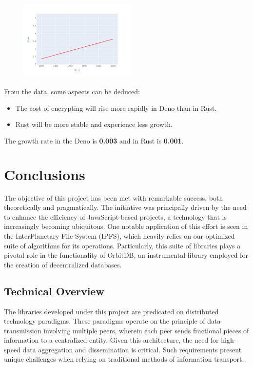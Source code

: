 \documentclass[10pt,journal,compsoc]{IEEEtran}
\begin{document}
\begin{figure}[H]
    \centering
    \includegraphics[width=0.52\textwidth]{images/trend_box_rust}
\end{figure}

From the data, some aspects can be deduced:
\begin{itemize}
    \item The cost of encrypting will rise more rapidly in Deno than in Rust.
    \item Rust will be more stable and experience less growth.
\end{itemize}

The growth rate in the Deno is \textbf{0.003} and in Rust is \textbf{0.001}.

\section{Conclusions}

The objective of this project has been met with remarkable success, both theoretically and pragmatically. The initiative was principally driven by the need to enhance the efficiency of JavaScript-based projects, a technology that is increasingly becoming ubiquitous. One notable application of this effort is seen in the InterPlanetary File System (IPFS), which heavily relies on our optimized suite of algorithms for its operations. Particularly, this suite of libraries plays a pivotal role in the functionality of OrbitDB, an instrumental library employed for the creation of decentralized databases.

\subsection{Technical Overview}

The libraries developed under this project are predicated on distributed technology paradigms. These paradigms operate on the principle of data transmission involving multiple peers, wherein each peer sends fractional pieces of information to a centralized entity. Given this architecture, the need for high-speed data aggregation and dissemination is critical. Such requirements present unique challenges when relying on traditional methods of information transport.
\end{document}
